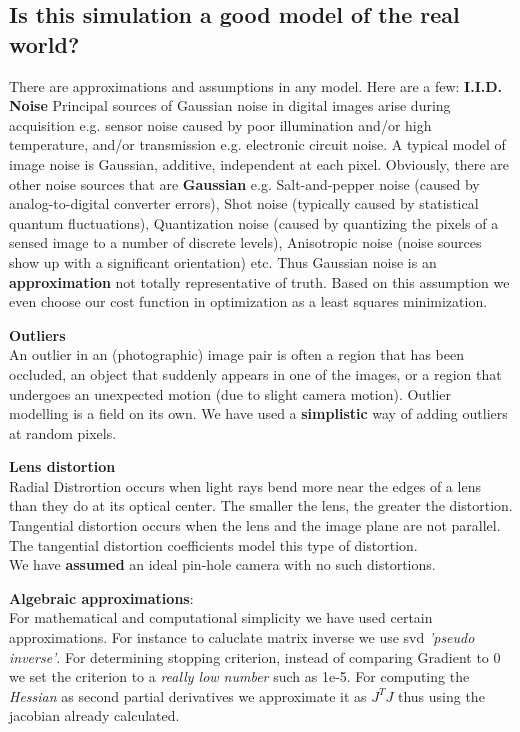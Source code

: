 \documentclass[titlepage]{article}
\begin{document}
\subsection{Is this simulation a good model of the real world?}
\label{realistic}
There are approximations and assumptions in any model. Here are a few:
\textbf{I.I.D. Noise}
Principal sources of Gaussian noise in digital images arise during acquisition e.g. sensor noise caused by poor illumination and/or high temperature, and/or transmission e.g. electronic circuit noise. A typical model of image noise is Gaussian, additive, independent at each pixel. Obviously, there are other noise sources that are \textbf{Gaussian} e.g. Salt-and-pepper noise (caused by analog-to-digital converter errors), Shot noise (typically caused by statistical quantum fluctuations), Quantization noise (caused by quantizing the pixels of a sensed image to a number of discrete levels), Anisotropic noise (noise sources show up with a significant orientation) etc. Thus Gaussian noise is an \textbf{approximation} not totally representative of truth. Based on this assumption we even choose our cost function in optimization as a least squares minimization.
\medskip

\textbf{Outliers}\\
An outlier in an (photographic) image pair is often a region that has been occluded, an object that suddenly appears in one of the images, or a region that undergoes an unexpected motion (due to slight camera motion). Outlier modelling is a field on its own. We have used a \textbf{simplistic} way of adding outliers at random pixels.
\medskip

\textbf{Lens distortion}\\
Radial Distrortion occurs when light rays bend more near the edges of a lens than they do at its optical center. The smaller the lens, the greater the distortion.\\
Tangential distortion occurs when the lens and the image plane are not parallel. The tangential distortion coefficients model this type of distortion.\\
We have \textbf{assumed} an ideal pin-hole camera with no such distortions.
\medskip

\textbf{Algebraic approximations}: \\
For mathematical and computational simplicity we have used certain approximations. For instance to caluclate matrix inverse we use svd \textit{'pseudo inverse'}. For determining stopping criterion, instead of comparing Gradient to 0 we set the criterion to a \textit{really low number} such as 1e-5. For computing the \textit{Hessian} as second partial derivatives we approximate it as $J^{T}J$ thus using the jacobian already calculated.
\end{document}
